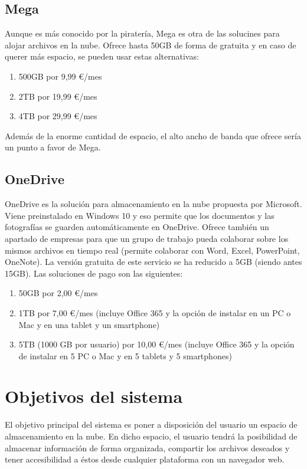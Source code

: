 \subsection{Mega \cite{cita_mega}}
Aunque es más conocido por la piratería, Mega es otra de las solucines para alojar archivos en la nube. Ofrece hasta 50GB de forma de gratuita y en caso de querer más espacio, se pueden usar estas alternativas:
\begin{enumerate}
	\item 500GB por 9,99 \euro/mes
	\item 2TB por 19,99 \euro/mes
	\item 4TB por 29,99 \euro/mes
\end{enumerate}
Además de la enorme cantidad de espacio, el alto ancho de banda que ofrece sería un punto a favor de Mega. \\

\subsection{OneDrive \cite{cita_onedrive}}
OneDrive es la solución para almacenamiento en la nube propuesta por Microsoft. Viene preinstalado en Windows 10 y eso permite que los documentos y las fotografías se guarden automáticamente en OneDrive. Ofrece también un apartado de empresas para que un grupo de trabajo pueda colaborar sobre los mismos archivos en tiempo real (permite colaborar con Word, Excel, PowerPoint, OneNote).
La versión gratuita de este servicio se ha reducido a 5GB (siendo antes 15GB). Las soluciones de pago son las siguientes:
\begin{enumerate}
	\item 50GB por 2,00 \euro/mes
	\item 1TB por 7,00 \euro/mes (incluye Office 365 y la opción de instalar en un PC o Mac y en una tablet y un smartphone)
	\item 5TB (1000 GB por usuario) por 10,00 \euro/mes (incluye Office 365 y la opción de instalar en 5 PC o Mac y en 5 tablets y 5 smartphones)
\end{enumerate}

\section{Objetivos del sistema}
El objetivo principal del sistema es poner a disposición del usuario un espacio de almacenamiento en la nube. En dicho espacio, el usuario tendrá la posibilidad de almacenar información de forma organizada, compartir los archivos deseados y tener accesibilidad a éstos desde cualquier plataforma con un navegador web. \\

